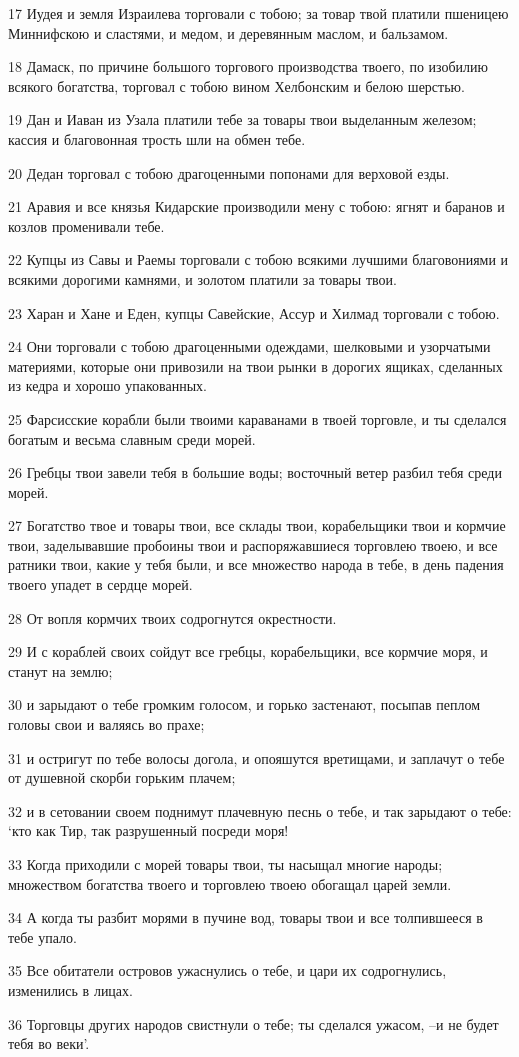\par 17 Иудея и земля Израилева торговали с тобою; за товар твой платили пшеницею Миннифскою и сластями, и медом, и деревянным маслом, и бальзамом.
\par 18 Дамаск, по причине большого торгового производства твоего, по изобилию всякого богатства, торговал с тобою вином Хелбонским и белою шерстью.
\par 19 Дан и Иаван из Узала платили тебе за товары твои выделанным железом; кассия и благовонная трость шли на обмен тебе.
\par 20 Дедан торговал с тобою драгоценными попонами для верховой езды.
\par 21 Аравия и все князья Кидарские производили мену с тобою: ягнят и баранов и козлов променивали тебе.
\par 22 Купцы из Савы и Раемы торговали с тобою всякими лучшими благовониями и всякими дорогими камнями, и золотом платили за товары твои.
\par 23 Харан и Хане и Еден, купцы Савейские, Ассур и Хилмад торговали с тобою.
\par 24 Они торговали с тобою драгоценными одеждами, шелковыми и узорчатыми материями, которые они привозили на твои рынки в дорогих ящиках, сделанных из кедра и хорошо упакованных.
\par 25 Фарсисские корабли были твоими караванами в твоей торговле, и ты сделался богатым и весьма славным среди морей.
\par 26 Гребцы твои завели тебя в большие воды; восточный ветер разбил тебя среди морей.
\par 27 Богатство твое и товары твои, все склады твои, корабельщики твои и кормчие твои, заделывавшие пробоины твои и распоряжавшиеся торговлею твоею, и все ратники твои, какие у тебя были, и все множество народа в тебе, в день падения твоего упадет в сердце морей.
\par 28 От вопля кормчих твоих содрогнутся окрестности.
\par 29 И с кораблей своих сойдут все гребцы, корабельщики, все кормчие моря, и станут на землю;
\par 30 и зарыдают о тебе громким голосом, и горько застенают, посыпав пеплом головы свои и валяясь во прахе;
\par 31 и остригут по тебе волосы догола, и опояшутся вретищами, и заплачут о тебе от душевной скорби горьким плачем;
\par 32 и в сетовании своем поднимут плачевную песнь о тебе, и так зарыдают о тебе: `кто как Тир, так разрушенный посреди моря!
\par 33 Когда приходили с морей товары твои, ты насыщал многие народы; множеством богатства твоего и торговлею твоею обогащал царей земли.
\par 34 А когда ты разбит морями в пучине вод, товары твои и все толпившееся в тебе упало.
\par 35 Все обитатели островов ужаснулись о тебе, и цари их содрогнулись, изменились в лицах.
\par 36 Торговцы других народов свистнули о тебе; ты сделался ужасом, --и не будет тебя во веки'.


